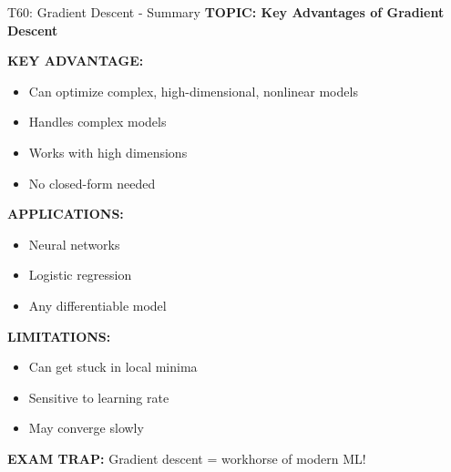 \documentclass[8pt]{beamer}
\begin{document}
	\begin{frame}{T60: Gradient Descent - Summary}
		\fontsize{6.5}{7.5}\selectfont
		\textbf{TOPIC: Key Advantages of Gradient Descent}
		
		\vspace{0.1cm}
		\textbf{KEY ADVANTAGE:}
		\begin{itemize}
			\item Can optimize complex, high-dimensional, nonlinear models
			\item Handles complex models
			\item Works with high dimensions
			\item No closed-form needed
		\end{itemize}
		
		\vspace{0.1cm}
		\textbf{APPLICATIONS:}
		\begin{itemize}
			\item Neural networks
			\item Logistic regression
			\item Any differentiable model
		\end{itemize}
		
		\vspace{0.1cm}
		\textbf{LIMITATIONS:}
		\begin{itemize}
			\item Can get stuck in local minima
			\item Sensitive to learning rate
			\item May converge slowly
		\end{itemize}
		
		\textcolor{myred}{\textbf{EXAM TRAP:}} Gradient descent = \textcolor{myblue}{workhorse of modern ML}!
	\end{frame}
	
	
\end{document}
